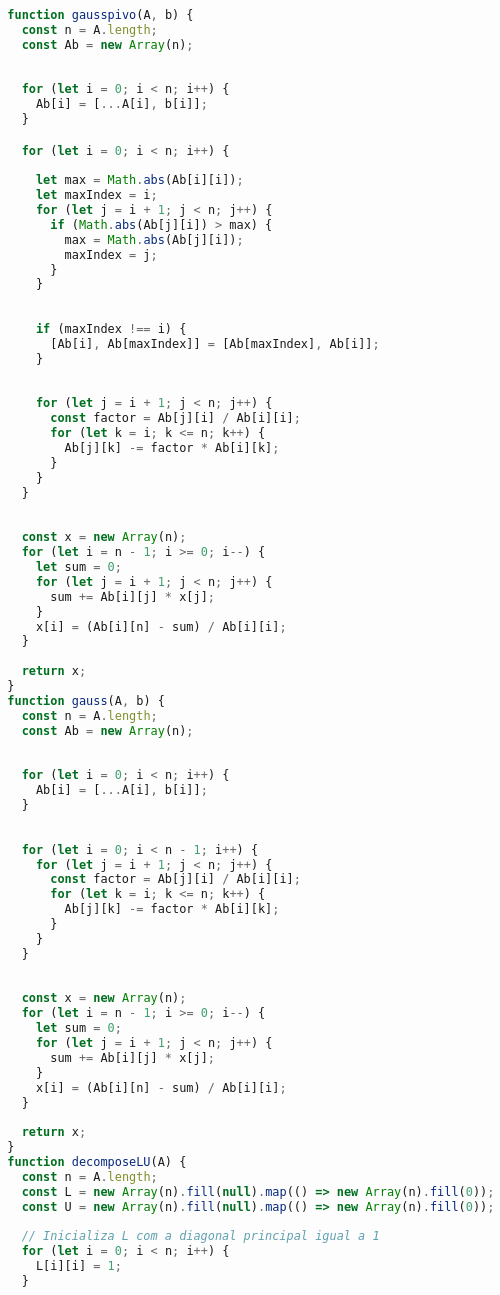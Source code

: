 \documentclass{article}
\begin{document}
\begin{lstlisting}[language=JavaScript, caption=métodos de eliminação de Gauss e Gauss com pivotamento.]
  
  function gausspivo(A, b) {
    const n = A.length;
    const Ab = new Array(n);
  
   
    for (let i = 0; i < n; i++) {
      Ab[i] = [...A[i], b[i]];
    }

    for (let i = 0; i < n; i++) {
    
      let max = Math.abs(Ab[i][i]);
      let maxIndex = i;
      for (let j = i + 1; j < n; j++) {
        if (Math.abs(Ab[j][i]) > max) {
          max = Math.abs(Ab[j][i]);
          maxIndex = j;
        }
      }
  
      
      if (maxIndex !== i) {
        [Ab[i], Ab[maxIndex]] = [Ab[maxIndex], Ab[i]];
      }
  
      
      for (let j = i + 1; j < n; j++) {
        const factor = Ab[j][i] / Ab[i][i];
        for (let k = i; k <= n; k++) {
          Ab[j][k] -= factor * Ab[i][k];
        }
      }
    }
  
    
    const x = new Array(n);
    for (let i = n - 1; i >= 0; i--) {
      let sum = 0;
      for (let j = i + 1; j < n; j++) {
        sum += Ab[i][j] * x[j];
      }
      x[i] = (Ab[i][n] - sum) / Ab[i][i];
    }
  
    return x;
  }
  function gauss(A, b) {
    const n = A.length;
    const Ab = new Array(n);
  
    
    for (let i = 0; i < n; i++) {
      Ab[i] = [...A[i], b[i]];
    }
  
    
    for (let i = 0; i < n - 1; i++) {
      for (let j = i + 1; j < n; j++) {
        const factor = Ab[j][i] / Ab[i][i];
        for (let k = i; k <= n; k++) {
          Ab[j][k] -= factor * Ab[i][k];
        }
      }
    }
  
    
    const x = new Array(n);
    for (let i = n - 1; i >= 0; i--) {
      let sum = 0;
      for (let j = i + 1; j < n; j++) {
        sum += Ab[i][j] * x[j];
      }
      x[i] = (Ab[i][n] - sum) / Ab[i][i];
    }
  
    return x;
  }
  function decomposeLU(A) {
    const n = A.length;
    const L = new Array(n).fill(null).map(() => new Array(n).fill(0));
    const U = new Array(n).fill(null).map(() => new Array(n).fill(0));
  
    // Inicializa L com a diagonal principal igual a 1
    for (let i = 0; i < n; i++) {
      L[i][i] = 1;
    }
  

\end{lstlisting}
\end{document}
